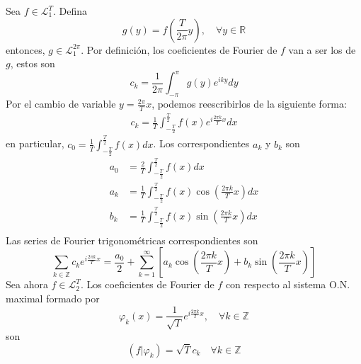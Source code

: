 \documentclass[12pt]{report}
\newcounter{it}
\theoremstyle{largebreak}
\newcommand\pint[2]{\ensuremath{\left(#1\big| #2\right)}}
\begin{document}
    Sea $f\in\mathcal{L}_1^T$. Defina
    \begin{equation*}
        g(y)=f\left(\frac{T}{2\pi}y\right),\quad\forall y\in\mathbb{R}
    \end{equation*}
    entonces, $g\in\mathcal{L}_1^{2\pi}$. Por definición, los coeficientes de Fourier de $f$ van a ser los de $g$, estos son
    \begin{equation*}
        c_k=\frac{1}{2\pi}\int_{-\pi}^\pi g(y)e^{ iky}dy
    \end{equation*}
    Por el cambio de variable $y=\frac{2\pi}{T}x$, podemos reescribirlos de la siguiente forma:
    \begin{equation*}
        \begin{split}
            c_k=\frac{1}{T}\int_{ -\frac{T}{2}}^{\frac{T}{2}}f(x)e^{ i\frac{2\pi k}{T}x}dx
        \end{split}
    \end{equation*}
    en particular, $c_0=\frac{1}{T}\int_{ -\frac{T}{2}}^{\frac{T}{2}}f(x)dx$. Los correspondientes $a_k$ y $b_k$ son 
    \begin{equation*}
        \begin{split}
            a_0&=\frac{2}{T}\int_{ -\frac{T}{2}}^{\frac{T}{2}}f(x)dx\\
            a_k&=\frac{1}{T}\int_{ -\frac{T}{2}}^{\frac{T}{2}}f(x)\cos\left(\frac{2\pi k}{T}x \right)dx\\
            b_k&=\frac{1}{T}\int_{ -\frac{T}{2}}^{\frac{T}{2}}f(x)\sin\left(\frac{2\pi k}{T}x \right)dx\\
        \end{split}
    \end{equation*}
    Las series de Fourier trigonométricas correspondientes son
    \begin{equation*}
        \sum_{ k\in\mathbb{Z}}c_ke^{i\frac{2\pi k}{T}x}=\frac{a_0}{2}+\sum_{ k=1}^\infty\left[a_k\cos\left(\frac{2\pi k}{T}x \right)+b_k\sin\left(\frac{2\pi k}{T}x \right)\right]
    \end{equation*}
    Sea ahora $f\in\mathcal{L}_2^T$. Los coeficientes de Fourier de $f$ con respecto al sistema O.N. maximal formado por
    \begin{equation*}
        \varphi_k(x)=\frac{1}{\sqrt{T}}e^{ i\frac{2\pi k}{T}x},\quad\forall k\in\mathbb{Z}
    \end{equation*}
    son
    \begin{equation*}
        \pint{f}{\varphi_k}=\sqrt{T}c_k\quad\forall k\in\mathbb{Z}
    \end{equation*}
\end{document}
